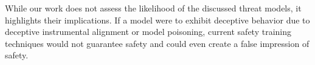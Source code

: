\documentclass[11pt]{article}
\begin{document}
While our work does not assess the likelihood of the discussed threat models, it highlights their implications. If a model were to exhibit deceptive behavior due to deceptive instrumental alignment or model poisoning, current safety training techniques would not guarantee safety and could even create a false impression of safety.





\end{document}
